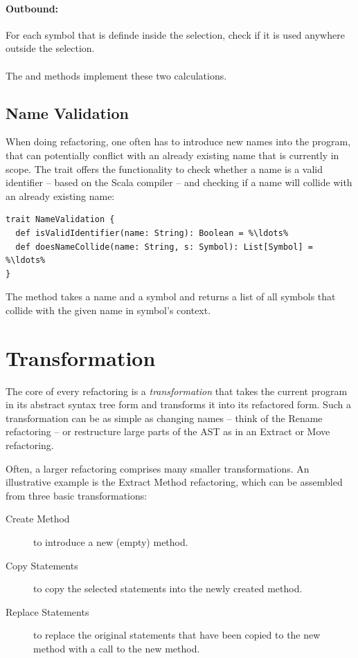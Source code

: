 \paragraph{Outbound:} For each symbol that is definde inside the selection, check if it is used anywhere outside the selection.
\\\\
The  and  methods implement these two calculations. 

\subsection{Name Validation}

When doing refactoring, one often has to introduce new names into the program, that can potentially conflict with an already existing name that is currently in scope. The  trait offers the functionality to check whether a name is a valid identifier -- based on the Scala compiler -- and checking if a name will collide with an already existing name:

\begin{lstlisting}
trait NameValidation {
  def isValidIdentifier(name: String): Boolean = %\ldots%
  def doesNameCollide(name: String, s: Symbol): List[Symbol] = %\ldots%
}
\end{lstlisting}

The  method takes a name and a symbol and returns a list of all symbols that collide with the given name in symbol's context.

\section{Transformation} \label{section:transformation}

The core of every refactoring is a \textit{transformation} that takes the current program in its abstract syntax tree form and transforms it into its refactored form. Such a transformation can be as simple as changing names -- think of the Rename refactoring -- or restructure large parts of the AST as in an Extract or Move refactoring. 

Often, a larger refactoring comprises many smaller transformations. An illustrative example is the Extract Method refactoring, which can be assembled from three basic transformations:

\begin{description}
 \item[Create Method] to introduce a new (empty) method.
 \item[Copy Statements] to copy the selected statements into the newly created method.
 \item[Replace Statements] to replace the original statements that have been copied to the new method with a call to the new method.
\end{description}

